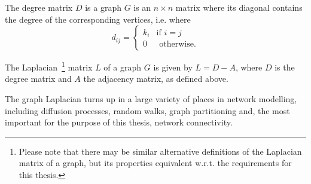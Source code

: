 \begin{definition}The degree matrix $D$ is a graph $G$ is an $n\times n $ matrix where its diagonal contains the degree of the corresponding vertices, i.e. where $$d_{ij} = \begin{cases}
    k_i & \text{if } i = j \\
	0 & \text{ otherwise.} 
\end{cases}$$
\end{definition}

\begin{definition}The Laplacian~\footnote{Please note that there may be similar alternative definitions of the Laplacian matrix of a graph, but its properties equivalent w.r.t. the requirements for this thesis.}  matrix $L$ of a graph $G$ is given by $L = D - A$, where $D$ is the degree matrix and $A$ the adjacency matrix, as defined above.
\end{definition}

\begin{remark}The graph Laplacian turns up in a large variety of places in network modelling, including diffusion processes, random walks, graph partitioning and, the most important for the purpose of this thesis, network connectivity.\end{remark}

